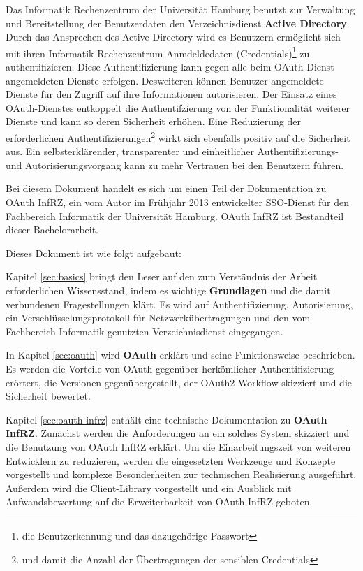 \documentclass[12pt,a4paper,pointednumbers,abstracton]{scrartcl}
\newcommand{\deactivate}[1]{}
\begin{document}
Das Informatik Rechenzentrum der Universität Hamburg benutzt zur Verwaltung und Bereitstellung der Benutzerdaten den Verzeichnisdienst \textbf{Active Directory}.
Durch das Ansprechen des Active Directory wird es Benutzern ermöglicht sich mit ihren Informatik-Rechenzentrum-Anmdeldedaten (Credentials)\footnote{die Benutzerkennung und das dazugehörige Passwort} zu authentifizieren.
Diese Authentifizierung kann gegen alle beim OAuth-Dienst angemeldeten Dienste erfolgen.
Desweiteren können Benutzer angemeldete Dienste für den Zugriff auf ihre Informationen autorisieren.
Der Einsatz eines OAuth-Dienstes entkoppelt die Authentifzierung von der Funktionalität weiterer Dienste und kann so deren Sicherheit erhöhen.
Eine Reduzierung der erforderlichen Authentifizierungen\footnote{und damit die Anzahl der Übertragungen der sensiblen Credentials} wirkt sich ebenfalls positiv auf die Sicherheit aus.
Ein selbsterklärender, transparenter und einheitlicher Authentifizierungs- und Autorisierungsvorgang kann zu mehr Vertrauen bei den Benutzern führen.

Bei diesem Dokument handelt es sich um einen Teil der Dokumentation zu OAuth InfRZ, ein vom Autor im Frühjahr 2013 entwickelter SSO-Dienst für den Fachbereich Informatik der Universität Hamburg.
OAuth InfRZ ist Bestandteil dieser Bachelorarbeit.

Dieses Dokument ist wie folgt aufgebaut:

\deactivate{
Kapitel \ref{sec:einleitung} liefert eine \textbf{Einleitung} in die Materie und soll OAuth InfRZ in einen Kontext bringen.
Es wird die Relevanz eines SSO-Dienstes erörtert, eine Implementierungsmöglichkeit skizziert und eine Zusammenfassung zu jedem Kapitel gegeben.
}

Kapitel \ref{sec:basics} bringt den Leser auf den zum Verständnis der Arbeit erforderlichen Wissensstand, indem es wichtige \textbf{Grundlagen} und die damit verbundenen Fragestellungen klärt.
Es wird auf Authentifizierung, Autorisierung, ein Verschlüsselungsprotokoll für Netzwerkübertragungen und den vom Fachbereich Informatik genutzten Verzeichnisdienst eingegangen.

In Kapitel \ref{sec:oauth} wird \textbf{OAuth} erklärt und seine Funktionsweise beschrieben.
Es werden die Vorteile von OAuth gegenüber herkömlicher Authentifizierung erörtert, die Versionen gegenübergestellt, der OAuth2 Workflow skizziert und die Sicherheit bewertet.

Kapitel \ref{sec:oauth-infrz} enthält eine technische Dokumentation zu \textbf{OAuth InfRZ}.
Zunächst werden die Anforderungen an ein solches System skizziert und die Benutzung von OAuth InfRZ erklärt.
Um die Einarbeitungszeit von weiteren Entwicklern zu reduzieren, werden die eingesetzten Werkzeuge und Konzepte vorgestellt und komplexe Besonderheiten zur technischen Realisierung ausgeführt.
Außerdem wird die Client-Library vorgestellt und ein Ausblick mit Aufwandsbewertung auf die Erweiterbarkeit von OAuth InfRZ geboten.
\end{document}
